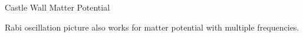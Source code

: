 \begin{frame}{Castle Wall Matter Potential}

\begin{tcolorbox}[opacityback=0, standard jigsaw, coltext=white]
  Rabi oscillation picture also works for matter potential with multiple frequencies.
\end{tcolorbox}


\begin{columns}[T]
\begin{column}{0.5\textwidth}




\end{column}
\end{columns}
\end{frame}
